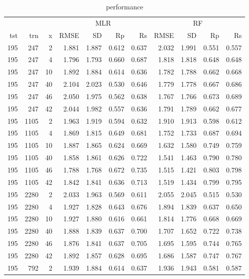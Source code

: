 \documentclass[journal=jacsat,manuscript=article]{achemso}
\begin{document}
\begin{table}
  \caption{performance}
  \label{tbl:performance}
  \begin{tabular}{rrr|rrrr|rrrr}
    \hline
    &&& \multicolumn{4}{c|}{MLR} & \multicolumn{4}{c}{RF}\\
    tst & trn & x & RMSE & SD & Rp & Rs & RMSE & SD & Rp & Rs\\
    \hline
195 & 247 & 2 & 1.881 & 1.887 & 0.612 & 0.637 & 2.032 & 1.991 & 0.551 & 0.557\\
195 & 247 & 4 & 1.796 & 1.793 & 0.660 & 0.687 & 1.818 & 1.818 & 0.648 & 0.648\\
195 & 247 & 10 & 1.892 & 1.884 & 0.614 & 0.636 & 1.782 & 1.788 & 0.662 & 0.668\\
195 & 247 & 40 & 2.104 & 2.023 & 0.530 & 0.646 & 1.779 & 1.778 & 0.667 & 0.686\\
195 & 247 & 46 & 2.050 & 1.975 & 0.562 & 0.638 & 1.767 & 1.766 & 0.673 & 0.689\\
195 & 247 & 42 & 2.044 & 1.982 & 0.557 & 0.636 & 1.791 & 1.789 & 0.662 & 0.677\\
195 & 1105 & 2 & 1.963 & 1.919 & 0.594 & 0.632 & 1.910 & 1.913 & 0.598 & 0.612\\
195 & 1105 & 4 & 1.869 & 1.815 & 0.649 & 0.681 & 1.752 & 1.733 & 0.687 & 0.694\\
195 & 1105 & 10 & 1.887 & 1.865 & 0.624 & 0.669 & 1.632 & 1.580 & 0.749 & 0.759\\
195 & 1105 & 40 & 1.858 & 1.861 & 0.626 & 0.722 & 1.541 & 1.463 & 0.790 & 0.780\\
195 & 1105 & 46 & 1.788 & 1.768 & 0.672 & 0.735 & 1.515 & 1.421 & 0.803 & 0.798\\
195 & 1105 & 42 & 1.842 & 1.841 & 0.636 & 0.713 & 1.519 & 1.434 & 0.799 & 0.795\\
195 & 2280 & 2 & 2.033 & 1.963 & 0.569 & 0.611 & 2.055 & 2.045 & 0.515 & 0.530\\
195 & 2280 & 4 & 1.927 & 1.828 & 0.643 & 0.676 & 1.894 & 1.839 & 0.637 & 0.650\\
195 & 2280 & 10 & 1.927 & 1.880 & 0.616 & 0.661 & 1.814 & 1.776 & 0.668 & 0.669\\
195 & 2280 & 40 & 1.888 & 1.839 & 0.637 & 0.700 & 1.707 & 1.652 & 0.722 & 0.738\\
195 & 2280 & 46 & 1.876 & 1.841 & 0.637 & 0.705 & 1.695 & 1.595 & 0.744 & 0.765\\
195 & 2280 & 42 & 1.892 & 1.857 & 0.628 & 0.695 & 1.686 & 1.587 & 0.747 & 0.767\\
195 & 792 & 2 & 1.939 & 1.884 & 0.614 & 0.637 & 1.936 & 1.943 & 0.581 & 0.587\\

\end{tabular}
\end{table}
\end{document}
